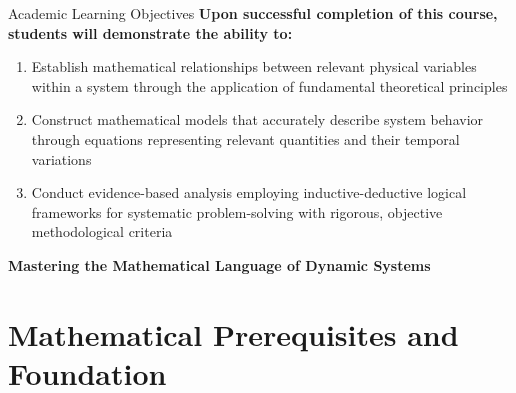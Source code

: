 \documentclass[10pt,aspectratio=169]{beamer}
\newcommand{\concept}[1]{\textcolor{mDarkTeal}{\textbf{#1}}}
\begin{document}
\begin{frame}{Academic Learning Objectives}
    \concept{Upon successful completion of this course, students will demonstrate the ability to:}
    
    \vspace{0.4cm}
    
    \begin{enumerate}
        \item Establish mathematical relationships between relevant physical variables within a system through the application of fundamental theoretical principles
        
        \vspace{0.3cm}
        
        \item Construct mathematical models that accurately describe system behavior through equations representing relevant quantities and their temporal variations
        
        \vspace{0.3cm}
        
        \item Conduct evidence-based analysis employing inductive-deductive logical frameworks for systematic problem-solving with rigorous, objective methodological criteria
    \end{enumerate}
    
    \vspace{0.4cm}
    
    \begin{center}
        \textcolor{mLightBrown}{\large\textbf{Mastering the Mathematical Language of Dynamic Systems}}
    \end{center}
\end{frame}

\section{Mathematical Prerequisites and Foundation}
\end{document}
